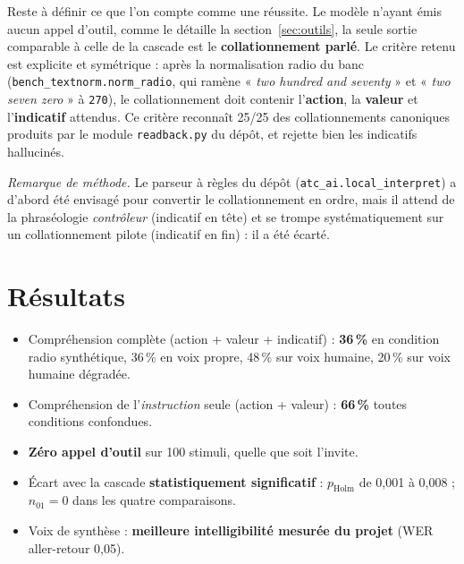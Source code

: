 \documentclass[11pt,a4paper]{article}
\begin{document}
Reste à définir ce que l'on compte comme une réussite. Le modèle n'ayant émis
aucun appel d'outil, comme le détaille la section~\ref{sec:outils}, la seule
sortie comparable à celle de la cascade est le \textbf{collationnement parlé}.
Le critère retenu est
explicite et symétrique : après la normalisation radio du banc
(\texttt{bench\_textnorm.norm\_radio}, qui ramène « \emph{two hundred and
seventy} » et « \emph{two seven zero} » à \texttt{270}), le collationnement doit
contenir l'\textbf{action}, la \textbf{valeur} et l'\textbf{indicatif} attendus.
Ce critère reconnaît 25/25 des collationnements canoniques produits par le
module \texttt{readback.py} du dépôt, et rejette bien les indicatifs
hallucinés.

\begin{center}
\footnotesize
\emph{Remarque de méthode.} Le parseur à règles du dépôt
(\texttt{atc\_ai.local\_interpret}) a d'abord été envisagé pour convertir le
collationnement en ordre, mais il attend de la phraséologie \emph{contrôleur}
(indicatif en tête) et se trompe systématiquement sur un collationnement pilote
(indicatif en fin) : il a été écarté.
\end{center}

\section{Résultats}

\begin{resbox}
\begin{itemize}
\item Compréhension complète (action + valeur + indicatif) :
  \textbf{36\,\%} en condition radio synthétique, 36\,\% en voix propre,
  48\,\% sur voix humaine, 20\,\% sur voix humaine dégradée.
\item Compréhension de l'\emph{instruction} seule (action + valeur) :
  \textbf{66\,\%} toutes conditions confondues.
\item \textbf{Zéro appel d'outil} sur 100 stimuli, quelle que soit l'invite.
\item Écart avec la cascade \textbf{statistiquement significatif} :
  $p_{\text{Holm}}$ de 0,001 à 0,008 ; $n_{01} = 0$ dans les quatre
  comparaisons.
\item Voix de synthèse : \textbf{meilleure intelligibilité mesurée du projet}
  (WER aller-retour 0,05).
\end{itemize}
\end{resbox}
\end{document}
